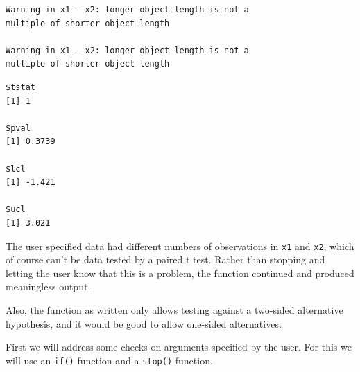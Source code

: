 \documentclass[
]{krantz}
\begin{document}
\begin{verbatim}
Warning in x1 - x2: longer object length is not a
multiple of shorter object length

Warning in x1 - x2: longer object length is not a
multiple of shorter object length
\end{verbatim}

\begin{verbatim}
$tstat
[1] 1

$pval
[1] 0.3739

$lcl
[1] -1.421

$ucl
[1] 3.021
\end{verbatim}

The user specified data had different numbers of observations in \texttt{x1} and \texttt{x2}, which of course can't be data tested by a paired t test. Rather than stopping and letting the user know that this is a problem, the function continued and produced meaningless output.

Also, the function as written only allows testing against a two-sided alternative hypothesis, and it would be good to allow one-sided alternatives.

First we will address some checks on arguments specified by the user. For this we will use an \texttt{if()} function and a \texttt{stop()} function.
\end{document}
